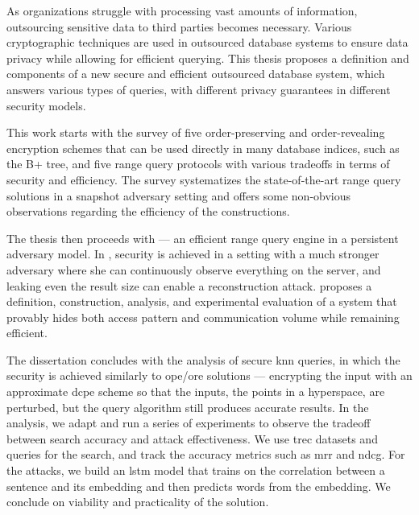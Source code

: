 As organizations struggle with processing vast amounts of information, outsourcing sensitive data to third parties becomes necessary.
Various cryptographic techniques are used in outsourced database systems to ensure data privacy while allowing for efficient querying.
This thesis proposes a definition and components of a new secure and efficient outsourced database system, which answers various types of queries, with different privacy guarantees in different security models.

This work starts with the survey of five order-preserving and order-revealing encryption schemes that can be used directly in many database indices, such as the B+ tree, and five range query protocols with various tradeoffs in terms of security and efficiency.
The survey systematizes the state-of-the-art range query solutions in a snapshot adversary setting and offers some non-obvious observations regarding the efficiency of the constructions.

The thesis then proceeds with \epsolute{} --- an efficient range query engine in a persistent adversary model.
In \epsolute{}, security is achieved in a setting with a much stronger adversary where she can continuously observe everything on the server, and leaking even the result size can enable a reconstruction attack.
\epsolute{} proposes a definition, construction, analysis, and experimental evaluation of a system that provably hides both access pattern and communication volume while remaining efficient.

The dissertation concludes with the analysis of secure \acrlong{knn} queries, in which the security is achieved similarly to \acrshort{ope}/\acrshort{ore} solutions --- encrypting the input with an approximate \acrlong{dcpe} scheme so that the inputs, the points in a hyperspace, are perturbed, but the query algorithm still produces accurate results.
In the analysis, we adapt and run a series of experiments to observe the tradeoff between search accuracy and attack effectiveness.
We use \acrshort{trec} datasets and queries for the search, and track the accuracy metrics such as \acrshort{mrr} and \acrshort{ndcg}.
For the attacks, we build an \acrshort{lstm} model that trains on the correlation between a sentence and its embedding and then predicts words from the embedding.
We conclude on viability and practicality of the solution.
